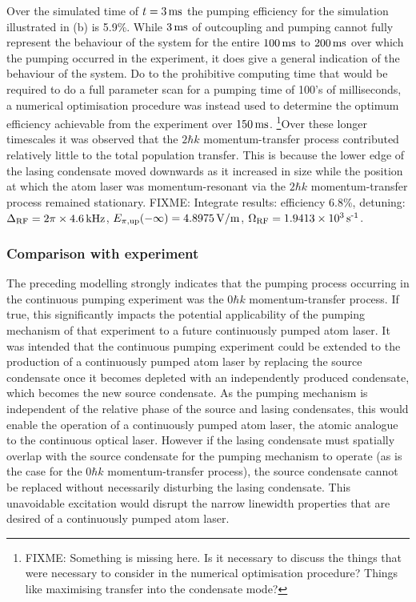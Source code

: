Over the simulated time of $t = \unit[3]{ms}$ the pumping efficiency for the simulation illustrated in (b) is 5.9\%.  While $\unit[3]{ms}$ of outcoupling and pumping cannot fully represent the behaviour of the system for the entire $\unit[100]{ms}$ to $\unit[200]{ms}$ over which the pumping occurred in the experiment, it does give a general indication of the behaviour of the system.  Do to the prohibitive computing time that would be required to do a full parameter scan for a pumping time of 100's of milliseconds, a numerical optimisation procedure was instead used to determine the optimum efficiency achievable from the experiment over $\unit[150]{ms}$.  \footnote{FIXME: Something is missing here.  Is it necessary to discuss the things that were necessary to consider in the numerical optimisation procedure?  Things like maximising transfer into the condensate mode?}Over these longer timescales it was observed that the $2 \hbar k$ momentum-transfer process contributed relatively little to the total population transfer.  This is because the lower edge of the lasing condensate moved downwards as it increased in size while the position at which the atom laser was momentum-resonant via the $2 \hbar k$ momentum-transfer process remained stationary.  FIXME: Integrate results: efficiency 6.8\%, detuning: $\Delta_\text{RF} = 2\pi \times \unit[4.6]{kHz}$, $E_{\pi, \text{up}}(-\infty) = \unit[4.8975]{V/m}$, $\Omega_\text{RF} = 1.9413\times \unit[10^3]{s\textsuperscript{-1}}$.


\subsubsection{Comparison with experiment}

The preceding modelling strongly indicates that the pumping process occurring in the continuous pumping experiment was the $0 \hbar k$ momentum-transfer process.  If true, this significantly impacts the potential applicability of the pumping mechanism of that experiment to a future continuously pumped atom laser.  It was intended that the continuous pumping experiment could be extended to the production of a continuously pumped atom laser by replacing the source condensate once it becomes depleted with an independently produced condensate, which becomes the new source condensate.  As the pumping mechanism is independent of the relative phase of the source and lasing condensates, this would enable the operation of a continuously pumped atom laser, the atomic analogue to the continuous optical laser.  However if the lasing condensate must spatially overlap with the source condensate for the pumping mechanism to operate (as is the case for the $0 \hbar k$ momentum-transfer process), the source condensate cannot be replaced without necessarily disturbing the lasing condensate.  This unavoidable excitation would disrupt the narrow linewidth properties that are desired of a continuously pumped atom laser.

